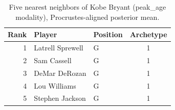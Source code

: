 \begin{table}[htbp]
  \centering\small
  \begin{tabular}{rllc}
    \toprule
    Rank & Player & Position & Archetype \\
    \midrule
    1 & Latrell Sprewell & G & 1 \\
    2 & Sam Cassell & G & 1 \\
    3 & DeMar DeRozan & G & 1 \\
    4 & Lou Williams & G & 1 \\
    5 & Stephen Jackson & G & 1 \\
    \bottomrule
  \end{tabular}
  \caption{Five nearest neighbors of Kobe Bryant (peak_age modality), Procrustes-aligned posterior mean.}
  \label{tab:Kobe_Bryant_neighbors_peak_age}
\end{table}

